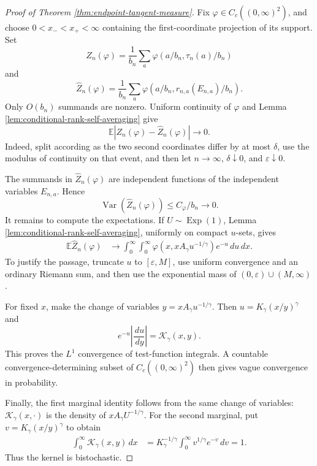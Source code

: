 \documentclass[11pt]{article}
\theoremstyle{remark}
\newcommand{\Ee}{\mathbb E}
\newcommand{\Exp}{\operatorname{Exp}}
\newcommand{\Var}{\operatorname{Var}}
\newcommand{\dd}{\,d}
\begin{document}
\begin{proof}[Proof of Theorem \ref{thm:endpoint-tangent-measure}]
Fix $\varphi\in C_c((0,\infty)^2)$, and choose
$0<x_-<x_+<\infty$ containing the first-coordinate projection of its support.
Set
\[
        Z_n(\varphi)=\frac1{b_n}\sum_a
        \varphi(a/b_n,\tau_n(a)/b_n)
\]
and
\[
        \widehat Z_n(\varphi)=\frac1{b_n}\sum_a
        \varphi(a/b_n,r_{n,a}(E_{n,a})/b_n).
\]
Only $O(b_n)$ summands are nonzero.  Uniform continuity of $\varphi$ and Lemma
\ref{lem:conditional-rank-self-averaging} give
\[
        \Ee|Z_n(\varphi)-\widehat Z_n(\varphi)|\longrightarrow0.
\]
Indeed, split according as the two second coordinates differ by at most
$\delta$, use the modulus of continuity on that event, and then let
$n\to\infty$, $\delta\downarrow0$, and $\varepsilon\downarrow0$.

The summands in $\widehat Z_n(\varphi)$ are independent functions of the
independent variables $E_{n,a}$.  Hence
\[
        \Var(\widehat Z_n(\varphi))\le C_\varphi/b_n\longrightarrow0.
\]
It remains to compute the expectations.  If $U\sim\Exp(1)$, Lemma
\ref{lem:conditional-rank-self-averaging}, uniformly on compact $u$-sets,
gives
\[
\begin{aligned}
        \Ee\widehat Z_n(\varphi)
        &\longrightarrow
        \int_0^\infty\int_0^\infty
        \varphi(x,xA_\gamma u^{-1/\gamma})e^{-u}\dd u\dd x.
\end{aligned}
\]
To justify the passage, truncate $u$ to $[\varepsilon,M]$, use uniform
convergence and an ordinary Riemann sum, and then use the exponential mass of
$(0,\varepsilon)\cup(M,\infty)$.

For fixed $x$, make the change of variables
$y=xA_\gamma u^{-1/\gamma}$.  Then
$u=K_\gamma(x/y)^\gamma$ and
\[
        e^{-u}\left|\frac{\dd u}{\dd y}\right|
        =\mathcal K_\gamma(x,y).
\]
This proves the $L^1$ convergence of test-function integrals.  A countable
convergence-determining subset of $C_c((0,\infty)^2)$ then gives vague
convergence in probability.

Finally, the first marginal identity follows from the same change of variables:
$\mathcal K_\gamma(x,\cdot)$ is the density of
$xA_\gamma U^{-1/\gamma}$.  For the second marginal, put
$v=K_\gamma(x/y)^\gamma$ to obtain
\[
\begin{aligned}
        \int_0^\infty\mathcal K_\gamma(x,y)\dd x
        &=K_\gamma^{-1/\gamma}
        \int_0^\infty v^{1/\gamma}e^{-v}\dd v=1.
\end{aligned}
\]
Thus the kernel is bistochastic.
\end{proof}
\end{document}
